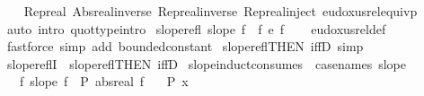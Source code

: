 \begin{isabellebody}
%
\isadelimproof
\ \ %
\endisadelimproof
%
\isatagproof
{}\isamarkupfalse%
\ Rep{\isacharunderscore}{\kern0pt}real\ Abs{\isacharunderscore}{\kern0pt}real{\isacharunderscore}{\kern0pt}inverse\ Rep{\isacharunderscore}{\kern0pt}real{\isacharunderscore}{\kern0pt}inverse\ Rep{\isacharunderscore}{\kern0pt}real{\isacharunderscore}{\kern0pt}inject\ eudoxus{\isacharunderscore}{\kern0pt}rel{\isacharunderscore}{\kern0pt}equivp\ \isamarkupfalse%
\ {\isacharparenleft}{\kern0pt}auto\ intro{\isacharbang}{\kern0pt}{\isacharcolon}{\kern0pt}\ quot{\isacharunderscore}{\kern0pt}type{\isachardot}{\kern0pt}intro{\isacharparenright}{\kern0pt}%
\endisatagproof
{\isafoldproof}%
%
\isadelimproof
\isanewline
%
\endisadelimproof
\isanewline
{}\isamarkupfalse%
\ slope{\isacharunderscore}{\kern0pt}refl{\isacharcolon}{\kern0pt}\ {\isachardoublequoteopen}slope\ f\ {\isacharequal}{\kern0pt}\ {\isacharparenleft}{\kern0pt}f\ {\isasymsim}\isactrlsub e\ f{\isacharparenright}{\kern0pt}{\isachardoublequoteclose}\isanewline
%
\isadelimproof
\ \ %
\endisadelimproof
%
\isatagproof
{}\isamarkupfalse%
\ eudoxus{\isacharunderscore}{\kern0pt}rel{\isacharunderscore}{\kern0pt}def\ \isamarkupfalse%
\ {\isacharparenleft}{\kern0pt}fastforce\ simp\ add{\isacharcolon}{\kern0pt}\ bounded{\isacharunderscore}{\kern0pt}constant{\isacharparenright}{\kern0pt}%
\endisatagproof
{\isafoldproof}%
%
\isadelimproof
\isanewline
%
\endisadelimproof
\isanewline
{}\isamarkupfalse%
\ slope{\isacharunderscore}{\kern0pt}refl{\isacharbrackleft}{\kern0pt}THEN\ iffD{}{\isacharcomma}{\kern0pt}\ simp{\isacharbrackright}{\kern0pt}\isanewline
\isanewline
{}\isamarkupfalse%
\ slope{\isacharunderscore}{\kern0pt}reflI\ {\isacharequal}{\kern0pt}\ slope{\isacharunderscore}{\kern0pt}refl{\isacharbrackleft}{\kern0pt}THEN\ iffD{}{\isacharbrackright}{\kern0pt}\isanewline
\isanewline
{}\isamarkupfalse%
\ slope{\isacharunderscore}{\kern0pt}induct{\isacharbrackleft}{\kern0pt}consumes\ {}{\isacharcomma}{\kern0pt}\ case{\isacharunderscore}{\kern0pt}names\ slope{\isacharbrackright}{\kern0pt}{\isacharcolon}{\kern0pt}\ \isanewline
\ \ \ {\isachardoublequoteopen}{\isasymAnd}f{\isachardot}{\kern0pt}\ slope\ f\ {\isasymLongrightarrow}\ P\ {\isacharparenleft}{\kern0pt}abs{\isacharunderscore}{\kern0pt}real\ f{\isacharparenright}{\kern0pt}{\isachardoublequoteclose}\isanewline
\ \ \ {\isachardoublequoteopen}P\ x{\isachardoublequoteclose}\isanewline
%
\isadelimproof

\end{isabellebody}

